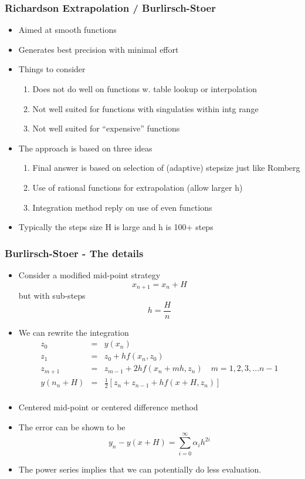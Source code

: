 \documentclass[10pt]{beamer}
\begin{document}
\begin{frame}
  \frametitle{Richardson Extrapolation / Burlirsch-Stoer}
  \begin{itemize}
  \item Aimed at smooth functions 
  \item Generates best precision with minimal effort
  \item Things to consider
    \begin{enumerate}
    \item Does not do well on functions w. table lookup or interpolation
    \item Not well suited for functions with singulaties within intg range
    \item Not well suited for ``expensive'' functions
    \end{enumerate}
  \item The approach is based on three ideas
    \begin{enumerate}
    \item Final answer is based on selection of (adaptive) stepsize just like Romberg
    \item Use of rational functions for extrapolation (allow larger h)
    \item Integration method reply on use of even functions
    \end{enumerate}
  \item Typically the steps size H is large and h is 100+ steps
  \end{itemize}
\end{frame}

\begin{frame}
  \frametitle{Burlirsch-Stoer - The details}
  \begin{itemize}
  \item Consider a modified mid-point strategy
    \[
      x_{n+1} = x_n + H
    \] but with sub-steps
    \[
      h = \frac{H}{n}
    \]
  \item We can rewrite the integration
    \[
      \begin{array}{rcl}
        z_0 & = & y(x_n)\\
        z_1 & = & z_0 + h f( x_n, z_0 )\\
        z_{m+1} & = & z_{m-1} + 2h f(x_{n} + mh, z_n) \mbox{~~~} m = 1, 2, 3, ...{n-1}\\
        y(n_n + H) & = & \frac{1}{2} [ z_n + z_{n-1} + h f(x+H, z_n) ] \\ 
      \end{array}
    \]
  \item Centered mid-point or centered difference method
  \item The error can be shown to be
    \[
      y_n - y(x+H) = \sum_{i=0}^{\infty} \alpha_i h^{2i}
    \]
  \item The power series implies that we can potentially do less evaluation. 
  \end{itemize}
\end{frame}
\end{document}
